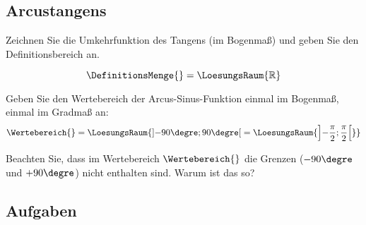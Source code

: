 \subsection{Arcustangens}
Zeichnen Sie die Umkehrfunktion des Tangens (im Bogenmaß) und geben Sie den Definitionsbereich an.



$$\DefinitionsMenge{} = \LoesungsRaum{\mathbb{R}}$$

Geben Sie den Wertebereich der Arcus-Sinus-Funktion einmal im Bogenmaß,
einmal im Gradmaß an:
$$\Wertebereich{} = \LoesungsRaum{\left]-90\degre; 90\degre\right[ = \LoesungsRaum{\left]-\frac{\pi}{2}; \frac{\pi}{2}\right[} }$$

Beachten Sie, dass im Wertebereich $\Wertebereich{}$ die Grenzen ($-90\degre$und $+90\degre$) nicht enthalten sind. Warum ist das so?

\subsection*{Aufgaben}
\TNTeop{}


